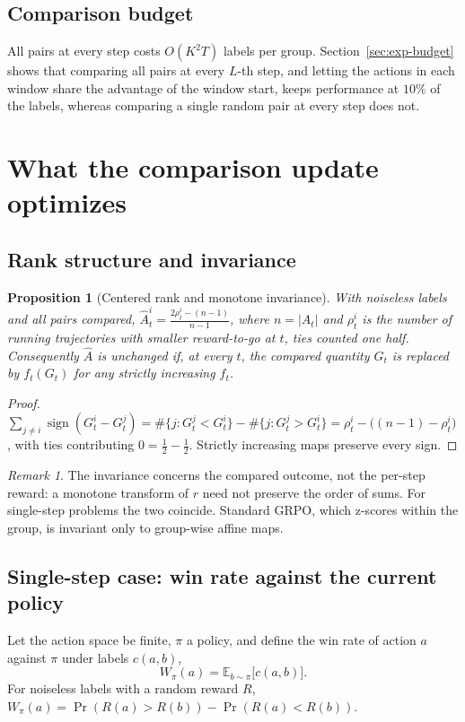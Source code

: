 \documentclass[11pt]{article}
\newtheorem{proposition}{Proposition}
\theoremstyle{remark}
\newtheorem{remark}{Remark}
\newcommand{\sgn}{\operatorname{sign}}
\newcommand{\E}{\mathbb{E}}
\begin{document}
\subsection{Comparison budget}
All pairs at every step costs $O(K^2T)$ labels per group. Section~\ref{sec:exp-budget} shows that comparing all pairs at every $L$-th step, and letting the actions in each window share the advantage of the window start, keeps performance at $10\%$ of the labels, whereas comparing a single random pair at every step does not.

\section{What the comparison update optimizes}
\label{sec:theory}

\subsection{Rank structure and invariance}
\begin{proposition}[Centered rank and monotone invariance]
\label{prop:rank}
With noiseless labels and all pairs compared, $\hat A^i_t = \frac{2\rho^i_t-(n-1)}{n-1}$, where $n=|A_t|$ and $\rho^i_t$ is the number of running trajectories with smaller reward-to-go at $t$, ties counted one half. Consequently $\hat A$ is unchanged if, at every $t$, the compared quantity $G_t$ is replaced by $f_t(G_t)$ for any strictly increasing $f_t$.
\end{proposition}
\begin{proof}
$\sum_{j\ne i}\sgn(G^i_t-G^j_t) = \#\{j:G^j_t<G^i_t\} - \#\{j:G^j_t>G^i_t\} = \rho^i_t-\big((n-1)-\rho^i_t\big)$, with ties contributing $0 = \tfrac12-\tfrac12$. Strictly increasing maps preserve every sign.
\end{proof}
\begin{remark}
The invariance concerns the compared outcome, not the per-step reward: a monotone transform of $r$ need not preserve the order of sums. For single-step problems the two coincide. Standard GRPO, which z-scores within the group, is invariant only to group-wise affine maps.
\end{remark}

\subsection{Single-step case: win rate against the current policy}
Let the action space be finite, $\pi$ a policy, and define the win rate of action $a$ against $\pi$ under labels $c(a,b)$,
\begin{equation}
W_\pi(a) = \E_{b\sim\pi}\big[c(a,b)\big].
\end{equation}
For noiseless labels with a random reward $R$, $W_\pi(a)=\Pr(R(a)>R(b))-\Pr(R(a)<R(b))$.
\end{document}
